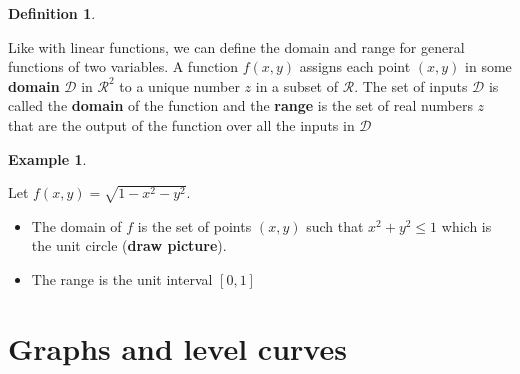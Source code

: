 \documentclass[
]{book}
\theoremstyle{definition}
\newtheorem{definition}{Definition}[chapter]
\theoremstyle{definition}
\newtheorem{example}{Example}[chapter]
\theoremstyle{definition}
\theoremstyle{remark}
\begin{document}
\begin{definition}
\protect\hypertarget{def:unlabeled-div-200}{}\label{def:unlabeled-div-200}

Like with linear functions, we can define the domain and range for general functions of two variables. A function \(f(x, y)\) assigns each point \((x, y)\) in some \textbf{domain} \(\mathcal{D}\) in \(\mathcal{R}^2\) to a unique number \(z\) in a subset of \(\mathcal{R}\). The set of inputs \(\mathcal{D}\) is called the \textbf{domain} of the function and the \textbf{range} is the set of real numbers \(z\) that are the output of the function over all the inputs in \(\mathcal{D}\)

\end{definition}

\begin{example}
\protect\hypertarget{exm:unlabeled-div-201}{}\label{exm:unlabeled-div-201}

Let \(f(x, y) = \sqrt{1 - x^2 - y^2}\).

\begin{itemize}
\item
  The domain of \(f\) is the set of points \((x, y)\) such that \(x^2 + y^2 \leq 1\) which is the unit circle (\textbf{draw picture}).
\item
  The range is the unit interval \([0, 1]\)
\end{itemize}

\end{example}

\hypertarget{graphs-and-level-curves}{%
\section{Graphs and level curves}\label{graphs-and-level-curves}}
\end{document}
